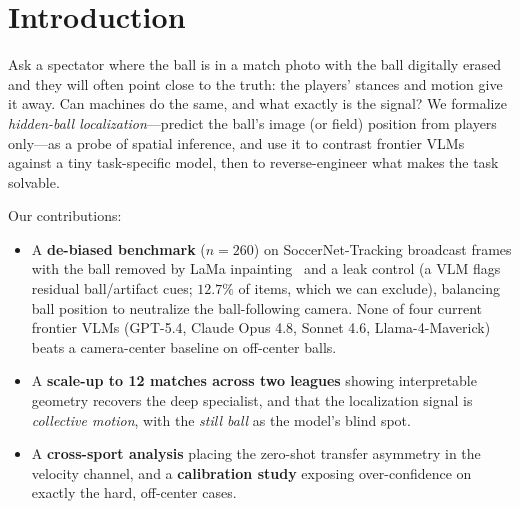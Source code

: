 
\section{Introduction}
Ask a spectator where the ball is in a match photo with the ball digitally erased and
they will often point close to the truth: the players' stances and motion give it away.
Can machines do the same, and what exactly is the signal? We formalize \emph{hidden-ball
localization}---predict the ball's image (or field) position from players only---as a
probe of spatial inference, and use it to contrast frontier VLMs against a tiny
task-specific model, then to reverse-engineer what makes the task solvable.

Our contributions:
\begin{itemize}
  \item A \textbf{de-biased benchmark} ($n=260$) on SoccerNet-Tracking broadcast frames
  with the ball removed by LaMa inpainting~\cite{suvorov2022lama} and a leak control (a VLM
  flags residual ball/artifact cues; $12.7\%$ of items, which we can exclude),
  balancing ball position to neutralize the ball-following camera. None of four current
  frontier VLMs (GPT-5.4, Claude Opus 4.8, Sonnet 4.6, Llama-4-Maverick) beats a
  camera-center baseline on off-center balls.
  \item A \textbf{scale-up to 12 matches across two leagues} showing interpretable
  geometry recovers the deep specialist, and that the localization signal is
  \emph{collective motion}, with the \emph{still ball} as the model's blind spot.
  \item A \textbf{cross-sport analysis} placing the zero-shot transfer asymmetry in the
  velocity channel, and a \textbf{calibration study} exposing over-confidence on exactly
  the hard, off-center cases.
\end{itemize}

